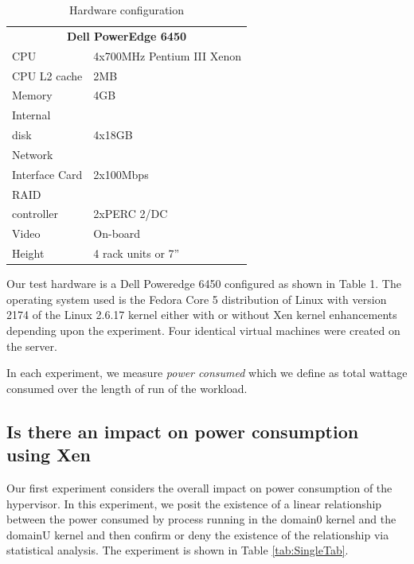 \documentclass[preprint]{sigplanconf}
\begin{document}
\begin{table}
  \centering
  \label{tab:hardware}
  \begin{tabular}{l|l}
    \hline
    \multicolumn{2}{c}{\bf{Dell PowerEdge 6450}}\\  
    CPU&4x700MHz Pentium III Xenon\\
    CPU L2 cache&2MB\\
    Memory&4GB\\
    Internal\\disk&4x18GB\\
    Network\\ Interface Card&2x100Mbps\\
    RAID\\ controller&2xPERC 2/DC\\
    Video&On-board \\
    Height&4 rack units or 7''\\
  \end{tabular}
  \caption{Hardware configuration}
\end{table}
Our test hardware is a Dell Poweredge 6450 configured as shown in Table 1.
The operating system used is the Fedora Core 5 distribution of Linux with
version 2174 of the Linux 2.6.17 kernel either with or without Xen kernel
enhancements depending upon the experiment.  Four identical virtual machines
were created on the server.

In each experiment, we measure \emph{power consumed} which we define as total
wattage consumed over the length of run of the workload.

\subsection{Is there an impact on power consumption using Xen}
\label{sec:XenImpact}
Our first experiment considers the overall impact on power consumption of the
hypervisor.   In this experiment, we posit the existence of a linear
relationship between the power consumed by process running in the domain0
kernel and the domainU kernel and then confirm or deny the existence of the
relationship via statistical analysis.  The experiment is shown in Table
\ref{tab:SingleTab}.
\end{document}
